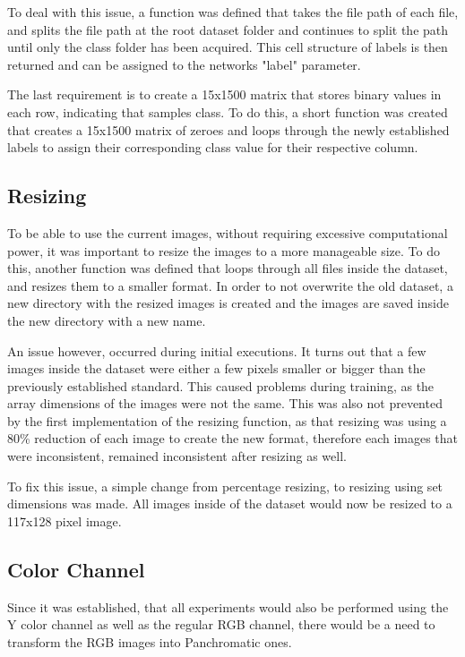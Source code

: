 To deal with this issue, a function was defined that takes the file path of each file, and splits the file path at the root dataset folder and continues to split the path until only the class folder has been acquired. This cell structure of labels is then returned and can be assigned to the networks "label" parameter.

The last requirement is to create a 15x1500 matrix that stores binary values in each row, indicating that samples class. To do this, a short function was created that creates a 15x1500 matrix of zeroes and loops through the newly established labels to assign their corresponding class value for their respective column. 

\subsection{Resizing}
To be able to use the current images, without requiring excessive computational power, it was important to resize the images to a more manageable size. To do this, another function was defined that loops through all files inside the dataset, and resizes them to a smaller format. In order to not overwrite the old dataset, a new directory with the resized images is created and the images are saved inside the new directory with a new name.

An issue however, occurred during initial executions. It turns out that a few images inside the dataset were either a few pixels smaller or bigger than the previously established standard. This caused problems during training, as the array dimensions of the images were not the same. This was also not prevented by the first implementation of the resizing function, as that resizing was using a 80\% reduction of each image to create the new format, therefore each images that were inconsistent, remained inconsistent after resizing as well.

To fix this issue, a simple change from percentage resizing, to resizing using set dimensions was made. All images inside of the dataset would now be resized to a 117x128 pixel image.

\subsection{Color Channel}
Since it was established, that all experiments would also be performed using the Y color channel as well as the regular RGB channel, there would be a need to transform the RGB images into Panchromatic ones.

